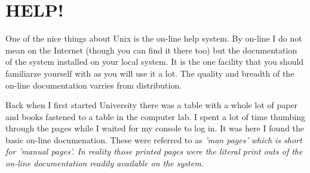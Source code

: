 \chapter{HELP!}

One of the nice things about Unix is the on-line help system. By on-line I do
not mean on the Internet (though you can find it there too) but the documentation of the system installed on your local system.  It is the one facility that you should familiarze yourself with as you will use it a lot.  The quality and breadth of the on-line documentation varries from distribution. 
 
Back when I first started University there was a table with a whole lot of paper and books fastened to a table in the computer lab.  I spent a lot of time
thumbing through the pages while I waited for my console to log in.  It was
here I found the basic on-line documenation.   These were referred to as 
\em{'man pages'} which is short for \em{'manual pages'}.  In reality those
printed pages were the literal print outs of the on-line documentation readily
available on the system.

